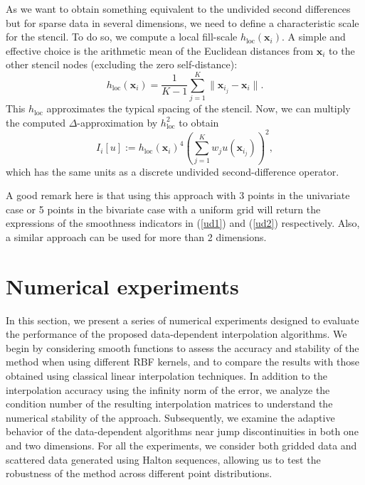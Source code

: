 \documentclass[preprint]{elsarticle}       %
\begin{document}
As we want to obtain something equivalent to the undivided second differences but for sparse data in several dimensions, we need to define a characteristic scale for the stencil. To do so, we compute a local fill-scale $h_{\text{loc}}(\mathbf{x}_i)$. A simple and effective choice is the arithmetic mean of the Euclidean distances from $\mathbf{x}_i$ to the other stencil nodes (excluding the zero self-distance):
\[
h_{\text{loc}}(\mathbf{x}_i) = \frac{1}{K-1} \sum_{j=1}^K \|\mathbf{x}_{i_j} - \mathbf{x}_i\|.
\]
This $h_{\text{loc}}$ approximates the typical spacing of the stencil. Now, we can multiply the computed $\Delta$-approximation by $h_{\text{loc}}^2$ to obtain
\[
I_i[u] := h_{\text{loc}}(\mathbf{x}_i)^4\left( \sum_{j=1}^K w_j u(\mathbf{x}_{i_j})\right)^2,
\]
which has the same units as a discrete undivided second-difference operator.

A good remark here is that using this approach with 3 points in the univariate case or 5 points in the bivariate case with a uniform grid will return the expressions of the smoothness indicators in (\ref{ud1}) and (\ref{ud2}) respectively. Also, a similar approach can be used for more than 2 dimensions.


\section{Numerical experiments}
In this section, we present a series of numerical experiments designed to evaluate the performance of the proposed data-dependent interpolation algorithms. We begin by considering smooth functions to assess the accuracy and stability of the method when using different RBF kernels, and to compare the results with those obtained using classical linear interpolation techniques. In addition to the interpolation accuracy using the infinity norm of the error, we analyze the condition number of the resulting interpolation matrices to understand the numerical stability of the approach. Subsequently, we examine the adaptive behavior of the data-dependent algorithms near jump discontinuities in both one and two dimensions. For all the experiments, we consider both gridded data and scattered data generated using Halton sequences, allowing us to test the robustness of the method across different point distributions.
\end{document}
